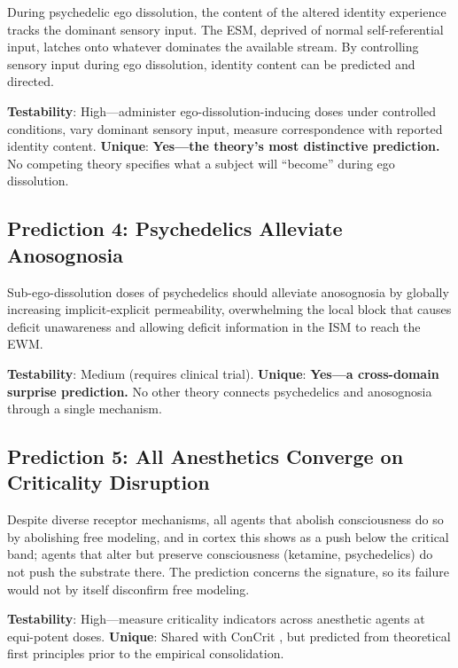 \documentclass[12pt]{article}
\begin{document}
During psychedelic ego dissolution, the content of the altered identity experience tracks the dominant sensory input. The ESM, deprived of normal self-referential input, latches onto whatever dominates the available stream. By controlling sensory input during ego dissolution, identity content can be predicted and directed.

\textbf{Testability}: High---\hspace{0pt}administer ego-dissolution-inducing doses under controlled conditions, vary dominant sensory input, measure correspondence with reported identity content. \textbf{Unique}: \textbf{Yes---\hspace{0pt}the theory's most distinctive prediction.} No competing theory specifies what a subject will ``become'' during ego dissolution.


\subsection{Prediction 4: Psychedelics Alleviate Anosognosia}

Sub-ego-dissolution doses of psychedelics should alleviate anosognosia by globally increasing implicit-explicit permeability, overwhelming the local block that causes deficit unawareness and allowing deficit information in the ISM to reach the EWM.

\textbf{Testability}: Medium (requires clinical trial). \textbf{Unique}: \textbf{Yes---\hspace{0pt}a cross-domain surprise prediction.} No other theory connects psychedelics and anosognosia through a single mechanism.


\subsection{Prediction 5: All Anesthetics Converge on Criticality Disruption}

Despite diverse receptor mechanisms, all agents that abolish consciousness do so by abolishing free modeling, and in cortex this shows as a push below the critical band; agents that alter but preserve consciousness (ketamine, psychedelics) do not push the substrate there. The prediction concerns the signature, so its failure would not by itself disconfirm free modeling.

\textbf{Testability}: High---\hspace{0pt}measure criticality indicators across anesthetic agents at equi-potent doses. \textbf{Unique}: Shared with ConCrit \citep{AlgomShriki2026}, but predicted from theoretical first principles \citep{Gruber2015} prior to the empirical consolidation.
\end{document}
